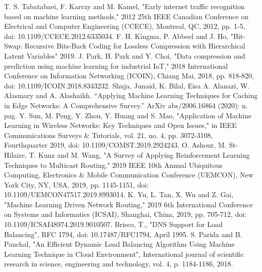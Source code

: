 \documentclass[conference]{IEEEtran}
\begin{document}
\begin{thebibliography}{1}
T. S. Tabatabaei, F. Karray and M. Kamel, "Early internet traffic recognition based on machine learning methods," 2012 25th IEEE Canadian Conference on Electrical and Computer Engineering (CCECE), Montreal, QC, 2012, pp. 1-5, doi: 10.1109/CCECE.2012.6335034.
F. H. Kingma, P. Abbeel and J. Ho, "Bit-Swap: Recursive Bits-Back Coding for Lossless Compression with Hierarchical Latent Variables" 2019.
J. Park, H. Park and Y. Choi, "Data compression and prediction using machine learning for industrial IoT," 2018 International Conference on Information Networking (ICOIN), Chiang Mai, 2018, pp. 818-820, doi: 10.1109/ICOIN.2018.8343232.
Shuja, Junaid, K. Bilal, Eisa A. Alanazi, W. Alasmary and A. Alashaikh. “Applying Machine Learning Techniques for Caching in Edge Networks: A Comprehensive Survey.” ArXiv abs/2006.16864 (2020): n. pag.
Y. Sun, M. Peng, Y. Zhou, Y. Huang and S. Mao, "Application of Machine Learning in Wireless Networks: Key Techniques and Open Issues," in IEEE Communications Surveys \& Tutorials, vol. 21, no. 4, pp. 3072-3108, Fourthquarter 2019, doi: 10.1109/COMST.2019.2924243.
O. Ashour, M. St-Hilaire, T. Kunz and M. Wang, "A Survey of Applying Reinforcement Learning Techniques to Multicast Routing," 2019 IEEE 10th Annual Ubiquitous Computing, Electronics \& Mobile Communication Conference (UEMCON), New York City, NY, USA, 2019, pp. 1145-1151, doi: 10.1109/UEMCON47517.2019.8993014.
K. Yu, L. Tan, X. Wu and Z. Gai, "Machine Learning Driven Network Routing," 2019 6th International Conference on Systems and Informatics (ICSAI), Shanghai, China, 2019, pp. 705-712, doi: 10.1109/ICSAI48974.2019.9010507.
Brisco, T., "DNS Support for Load Balancing", RFC 1794, doi: 10.17487/RFC1794, April 1995.
S. Parida and B. Panchal, "An Efficient Dynamic Load Balancing Algorithm Using Machine Learning Technique in Cloud Environment", International journal of scientific research in science, engineering and technology, vol. 4, p. 1184-1186, 2018.

\end{thebibliography}
\end{document}
